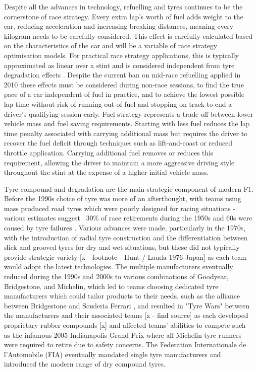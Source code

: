 Despite all the advances in technology, refuelling and tyres continues to be the cornerstone of race strategy. Every extra lap's worth of fuel adds weight to the car, reducing acceleration and increasing breaking distances, meaning every kilogram needs to be carefully considered. This effect is carefully calculated based on the characteristics of the car and will be a variable of race strategy optimisation models. For practical race strategy applications, this is typically approximated as linear over a stint and is considered independent from tyre degradation effects \cite{Cappello2026TyreDegradation}. Despite the current ban on mid-race refuelling applied in 2010 \cite{FIA2010SportingRegulations} these effects must be considered during non-race sessions, to find the true pace of a car independent of fuel in practice, and to achieve the lowest possible lap time without risk of running out of fuel and stopping on track to end a driver's qualifying session early. Fuel strategy represents a trade-off between lower vehicle mass and fuel saving requirements. Starting with less fuel reduces the lap time penalty associated with carrying additional mass but requires the driver to recover the fuel deficit through techniques such as lift-and-coast or reduced throttle application. Carrying additional fuel removes or reduces this requirement, allowing the driver to maintain a more aggressive driving style throughout the stint at the expense of a higher initial vehicle mass.

Tyre compound and degradation are the main strategic component of modern F1. Before the 1990s choice of tyre was more of an afterthought, with teams using mass produced road tyres which were poorly designed for racing situations - various estimates suggest ~30\% of race retirements during the 1950s and 60s were caused by tyre failures \cite{GrandPrix2472023TyreEvolution}. Various advances were made, particularly in the 1970s, with the introduction of radial tyre construction and the differentiation between slick and grooved tyres for dry and wet situations, but these did not typically provide strategic variety [x - footnote - Hunt / Lauda 1976 Japan] as each team would adopt the latest technologies. The multiple manufacturers eventually reduced during the 1990s and 2000s to various combinations of Goodyear, Bridgestone, and Michelin, which led to teams choosing dedicated tyre manufacturers which could tailor products to their needs, such as the alliance between Bridgestone and Scuderia Ferrari \cite{Bridgestone2002FerrariPartnership,Crash2005FerrariBridgestone}, and resulted in "Tyre Wars" between the manufacturers and their associated teams [x - find source] as each developed proprietary rubber compounds [x] and affected teams' abilities to compete such as the infamous 2005 Indianapolis Grand Prix where all Michelin tyre runners were required to retire due to safety concerns. The Federation Internationale de l'Automobile (FIA) eventually mandated single tyre manufacturers and introduced the modern range of dry compound tyres. 

